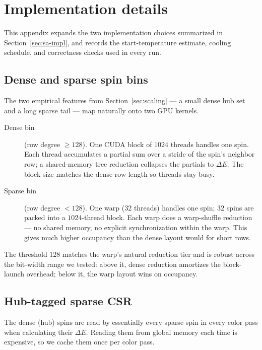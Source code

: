 \documentclass[reprint,twocolumn,amsmath,amssymb,nofootinbib]{revtex4-2}
\newcommand{\dE}{\Delta E}
\begin{document}
\section{Implementation details}\label{app:impl}

This appendix expands the two implementation choices summarized in Section~\ref{sec:sa-impl}, and records the start-temperature estimate, cooling schedule, and correctness checks used in every run.

\subsection{Dense and sparse spin bins}\label{sec:sa-bins}

The two empirical features from Section~\ref{sec:scaling} --- a small dense hub set and a long sparse tail --- map naturally onto two GPU kernels.
\begin{description}
\item[Dense bin] (row degree $\geq 128$). One CUDA block of $1024$ threads handles one spin. Each thread accumulates a partial sum over a stride of the spin's neighbor row; a shared-memory tree reduction collapses the partials to $\dE$. The block size matches the dense-row length so threads stay busy.
\item[Sparse bin] (row degree $< 128$). One warp ($32$ threads) handles one spin; $32$ spins are packed into a $1024$-thread block. Each warp does a warp-shuffle reduction --- no shared memory, no explicit synchronization within the warp. This gives much higher occupancy than the dense layout would for short rows.
\end{description}
The threshold $128$ matches the warp's natural reduction tier and is robust across the bit-width range we tested: above it, dense reduction amortizes the block-launch overhead; below it, the warp layout wins on occupancy.

\subsection{Hub-tagged sparse CSR}\label{sec:sa-hubs}

The dense (hub) spins are read by essentially every sparse spin in every color pass when calculating their $\dE$. Reading them from global memory each time is expensive, so we cache them once per color pass.
\end{document}
